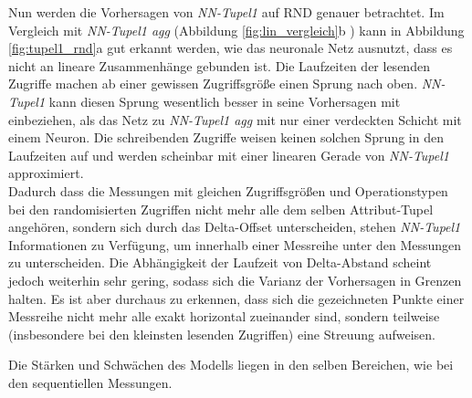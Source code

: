 \documentclass[
	12pt,
	a4paper,
	BCOR10mm,
	DIV14,
	listof=totoc,
	bibliography=totoc,
	headsepline
]{scrreprt}
\begin{document}
Nun werden die Vorhersagen von \textit{NN-Tupel1} auf RND genauer betrachtet.
Im Vergleich mit \textit{NN-Tupel1 agg} (Abbildung \ref{fig:lin_vergleich}b ) kann in Abbildung \ref{fig:tupel1_rnd}a gut erkannt werden, wie das neuronale Netz ausnutzt, dass es nicht an lineare Zusammenhänge gebunden ist.
Die Laufzeiten der lesenden Zugriffe machen ab einer gewissen Zugriffsgröße einen Sprung nach oben. \textit{NN-Tupel1} kann diesen Sprung wesentlich besser in seine Vorhersagen mit einbeziehen, als das Netz zu \textit{NN-Tupel1 agg} mit nur einer verdeckten Schicht mit einem Neuron.
Die schreibenden Zugriffe weisen keinen solchen Sprung in den Laufzeiten auf und werden scheinbar mit einer linearen Gerade von \textit{NN-Tupel1} approximiert.\\
Dadurch dass die Messungen mit gleichen Zugriffsgrößen und Operationstypen bei den randomisierten Zugriffen nicht mehr alle dem selben Attribut-Tupel angehören, sondern sich durch das Delta-Offset unterscheiden, stehen \textit{NN-Tupel1} Informationen zu Verfügung, um innerhalb einer Messreihe unter den Messungen zu unterscheiden.
Die Abhängigkeit der Laufzeit von Delta-Abstand scheint jedoch weiterhin sehr gering, sodass sich die Varianz der Vorhersagen in Grenzen halten.
Es ist aber durchaus zu erkennen, dass sich die gezeichneten Punkte einer Messreihe nicht mehr alle exakt horizontal zueinander sind, sondern teilweise (insbesondere bei den kleinsten lesenden Zugriffen) eine Streuung aufweisen.\medskip

Die Stärken und Schwächen des Modells liegen
in den selben Bereichen, wie bei den sequentiellen Messungen.
\end{document}
